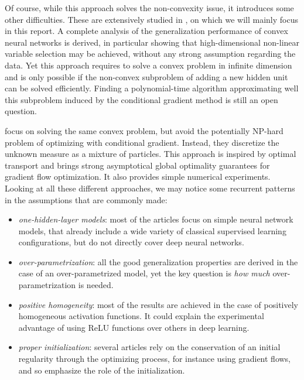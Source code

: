 \documentclass[a4paper, 11pt]{scrartcl}
\begin{document}
{Of course, while this approach solves the non-convexity issue, it introduces some other difficulties. These are extensively studied in \cite{bach2017breaking}, on which we will mainly focus in this report. A complete analysis of the generalization performance of convex neural networks is derived, in particular showing that high-dimensional non-linear variable selection may be achieved, without any strong assumption regarding the data. Yet this approach requires to solve a convex problem in infinite dimension and is only possible if the non-convex subproblem of adding a new hidden unit can be solved efficiently. Finding a polynomial-time algorithm approximating well this subproblem induced by the conditional gradient method is still an open question.

\cite{chizat2018global} focus on solving the same convex problem, but avoid the potentially NP-hard problem of optimizing with conditional gradient. Instead, they discretize the unknown measure as a mixture of particles. This approach is inspired by optimal transport and brings strong asymptotical global optimality guarantees for gradient flow optimization. It also provides simple numerical experiments.\\

Looking at all these different approaches, we may notice some recurrent patterns in the assumptions that are commonly made:

\begin{itemize}
\item \textit{one-hidden-layer models}: most of the articles focus on simple neural network models, that already include a wide variety of classical supervised learning configurations, but do not directly cover deep neural networks.
\item \textit{over-parametrization}: all the good generalization properties are derived in the case of an over-parametrized model, yet the key question is \textit{how much} over-parametrization is needed.
\item \textit{positive homogeneity}: most of the results are achieved in the case of positively homogeneous activation functions. It could explain the experimental advantage of using ReLU functions over others in deep learning.
\item \textit{proper initialization}: several articles rely on the conservation of an initial regularity through the optimizing process, for instance using gradient flows, and so emphasize the role of the initialization.
\end{itemize}

}
\end{document}
